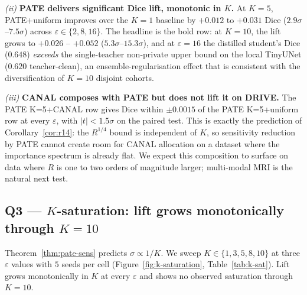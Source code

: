 \emph{(ii)} \textbf{PATE delivers significant Dice lift, monotonic in
$K$.} At $K\!=\!5$, PATE+uniform improves over the $K\!=\!1$ baseline by
$+0.012$ to $+0.031$ Dice ($2.9\sigma$--$7.5\sigma$) across
$\varepsilon\!\in\!\{2,8,16\}$. The headline is the bold row: at
$K\!=\!10$, the lift grows to $+0.026$ -- $+0.052$
($5.3\sigma$--$15.3\sigma$), and at $\varepsilon\!=\!16$ the distilled
student's Dice ($0.648$) \emph{exceeds} the single-teacher non-private
upper bound on the local TinyUNet ($0.620$ teacher-clean), an
ensemble-regularisation effect that is consistent with the
diversification of $K\!=\!10$ disjoint cohorts.

\emph{(iii)} \textbf{CANAL composes with PATE but does not lift it on
DRIVE.} The PATE K=5+CANAL row gives Dice within $\pm 0.0015$ of the
PATE K=5+uniform row at every $\varepsilon$, with $|t|\!<\!1.5\sigma$ on
the paired test. This is exactly the prediction of
Corollary~\ref{cor:r14}: the $R^{1/4}$ bound is independent of $K$, so
sensitivity reduction by PATE cannot create room for CANAL allocation
on a dataset where the importance spectrum is already flat. We expect
this composition to surface on data where $R$ is one to two orders of
magnitude larger; multi-modal MRI is the natural next test.

\subsection{Q3 — $K$-saturation: lift grows monotonically through $K\!=\!10$}
\label{ssec:q3-k-sweep}

Theorem~\ref{thm:pate-sens} predicts $\sigma\!\propto\!1/K$. We sweep
$K\!\in\!\{1, 3, 5, 8, 10\}$ at three $\varepsilon$ values with
$5$ seeds per cell (Figure~\ref{fig:k-saturation},
Table~\ref{tab:k-sat}). Lift grows monotonically in $K$ at every
$\varepsilon$ and shows no observed saturation through $K\!=\!10$.

